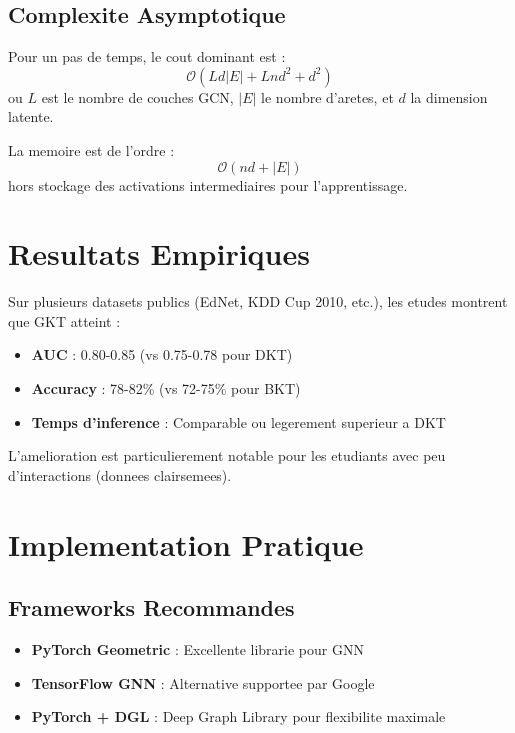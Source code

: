 \documentclass[11pt, a4paper]{article}
\begin{document}
\subsection{Complexite Asymptotique}

Pour un pas de temps, le cout dominant est :
\begin{equation}
    \mathcal{O}(Ld|E| + Lnd^2 + d^2)
\end{equation}
ou $L$ est le nombre de couches GCN, $|E|$ le nombre d'aretes, et $d$ la dimension latente.

La memoire est de l'ordre :
\begin{equation}
    \mathcal{O}(nd + |E|)
\end{equation}
hors stockage des activations intermediaires pour l'apprentissage.

\section{Resultats Empiriques}

Sur plusieurs datasets publics (EdNet, KDD Cup 2010, etc.), les etudes montrent que GKT atteint :

\begin{itemize}
    \item \textbf{AUC} : 0.80-0.85 (vs 0.75-0.78 pour DKT)
    \item \textbf{Accuracy} : 78-82\% (vs 72-75\% pour BKT)
    \item \textbf{Temps d'inference} : Comparable ou legerement superieur a DKT
\end{itemize}

L'amelioration est particulierement notable pour les etudiants avec peu d'interactions (donnees clairsemees).

\section{Implementation Pratique}

\subsection{Frameworks Recommandes}

\begin{itemize}
    \item \textbf{PyTorch Geometric} : Excellente librarie pour GNN
    \item \textbf{TensorFlow GNN} : Alternative supportee par Google
    \item \textbf{PyTorch + DGL} : Deep Graph Library pour flexibilite maximale
\end{itemize}
\end{document}
